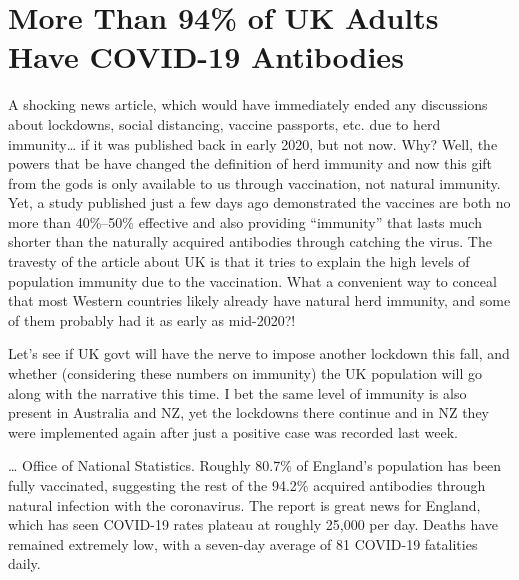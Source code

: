 \chapter{More Than 94\% of UK Adults Have COVID-19 Antibodies}

\begin{refsection}

A shocking news article, which would have immediately ended any discussions about lockdowns, social distancing, vaccine passports, etc. due to herd immunity\dots{} if it was published back in early 2020, but not now. Why? Well, the powers that be have changed the definition of herd immunity and now this gift from the gods is only available to us through vaccination, not natural immunity. Yet, a study published just a few days ago demonstrated the vaccines are both no more than 40\%--50\% effective and also providing \enquote{immunity} that lasts much shorter than the naturally acquired antibodies through catching the virus. The travesty of the article about UK is that it tries to explain the high levels of population immunity due to the vaccination. What a convenient way to conceal that most Western countries likely already have natural herd immunity, and some of them probably had it as early as mid-2020?!

Let's see if UK govt will have the nerve to impose another lockdown this fall, and whether (considering these numbers on immunity) the UK population will go along with the narrative this time. I bet the same level of immunity is also present in Australia and NZ, yet the lockdowns there continue and in NZ they were implemented again after just a  positive case was recorded last week.\textsuperscript{\cite{url91238g0h}}

\begin{tcolorbox}[quote]

\dots{} Office of National Statistics.\textsuperscript{\cite{url7243d0b8}} Roughly 80.7\% of England's population has been fully vaccinated, suggesting the rest of the 94.2\% acquired antibodies through natural infection with the coronavirus. The report is great news for England, which has seen COVID-19 rates plateau at roughly 25,000 per day. Deaths have remained extremely low, with a seven-day average of 81 COVID-19 fatalities daily.\textsuperscript{\cite{urlas0dc8yhs}}

\end{tcolorbox}

\printbibliography[heading=subbibliography]

\end{refsection}